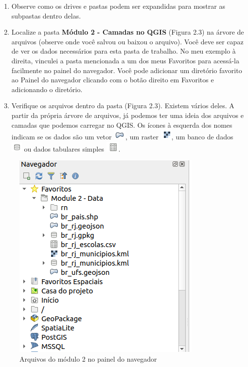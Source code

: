 \documentclass[
]{book}
\providecommand{\tightlist}{%
  \setlength{\itemsep}{0pt}\setlength{\parskip}{0pt}}
\begin{document}
\begin{enumerate}
\def\labelenumi{\arabic{enumi}.}
\setcounter{enumi}{2}
\tightlist
\item
  Observe como os drives e pastas podem ser expandidas para mostrar as subpastas dentro delas.
\item
  Localize a pasta \textbf{Módulo 2 - Camadas no QGIS} (Figura 2.3) na árvore de arquivos (observe onde você salvou ou baixou o arquivo). Você deve ser capaz de ver os dados necessários para esta pasta de trabalho. No meu exemplo à direita, vinculei a pasta mencionada a um dos meus Favoritos para acessá-la facilmente no painel do navegador. Você pode adicionar um diretório favorito ao Painel do navegador clicando com o botão direito em Favoritos e adicionando o diretório.
\item
  Verifique os arquivos dentro da pasta (Figura 2.3). Existem vários deles. A partir da própria árvore de arquivos, já podemos ter uma ideia dos arquivos e camadas que podemos carregar no QGIS. Os ícones à esquerda dos nomes indicam se os dados são um vetor \includegraphics{media/modulo2/symbol-vector.png}, um raster \includegraphics{media/modulo2/symbol-raster.png}, um banco de dados \includegraphics{media/modulo2/symbol-db.png} ou dados tabulares simples \includegraphics{media/modulo2/symbol-table.png}.
\end{enumerate}

\begin{figure}
\centering
\includegraphics{media/modulo2/qgis-browser-2.png}
\caption{Arquivos do módulo 2 no painel do navegador}
\end{figure}
\end{document}
